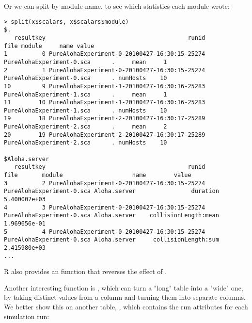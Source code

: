 Or we can split by module name, to see which statistics each module wrote:

\begin{verbatim}
> split(x$scalars, x$scalars$module)
$.
   resultkey                                         runid                      file module     name value
1          0 PureAlohaExperiment-0-20100427-16:30:15-25274 PureAlohaExperiment-0.sca      .     mean     1
2          1 PureAlohaExperiment-0-20100427-16:30:15-25274 PureAlohaExperiment-0.sca      . numHosts    10
10         9 PureAlohaExperiment-1-20100427-16:30:16-25283 PureAlohaExperiment-1.sca      .     mean     1
11        10 PureAlohaExperiment-1-20100427-16:30:16-25283 PureAlohaExperiment-1.sca      . numHosts    10
19        18 PureAlohaExperiment-2-20100427-16:30:17-25289 PureAlohaExperiment-2.sca      .     mean     2
20        19 PureAlohaExperiment-2-20100427-16:30:17-25289 PureAlohaExperiment-2.sca      . numHosts    10

$Aloha.server
   resultkey                                         runid                      file       module                    name        value
3          2 PureAlohaExperiment-0-20100427-16:30:15-25274 PureAlohaExperiment-0.sca Aloha.server                duration 5.400007e+03
4          3 PureAlohaExperiment-0-20100427-16:30:15-25274 PureAlohaExperiment-0.sca Aloha.server    collisionLength:mean 1.969656e-01
5          4 PureAlohaExperiment-0-20100427-16:30:15-25274 PureAlohaExperiment-0.sca Aloha.server     collisionLength:sum 2.415980e+03
...
\end{verbatim}

R also provides an  function that reverses the effect of .

Another interesting function is , which can turn a "long" table
into a "wide" one, by taking distinct values from a column and turning them
into separate columns. We better show this on another table, ,
which contains the run attributes for each simulation run:

